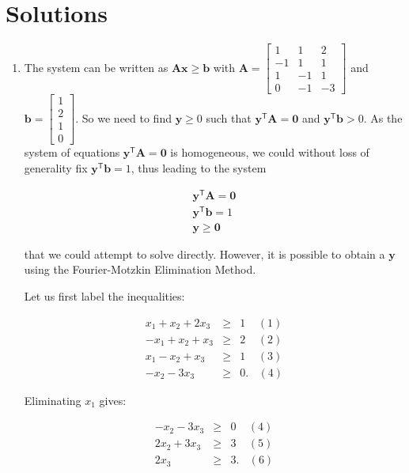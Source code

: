 \documentclass[]{book}
\providecommand{\tightlist}{%
  \setlength{\itemsep}{0pt}\setlength{\parskip}{0pt}}
\def\gt{>}
\newcommand{\mm}[1]{\mathbf{#1}}
\renewcommand{\vec}[1]{\mathbf{#1}}
\theoremstyle{definition}
\theoremstyle{definition}
\theoremstyle{remark}
\begin{document}
\section*{Solutions}\label{solutions-4}

\begin{enumerate}
\def\labelenumi{\arabic{enumi}.}
\tightlist
\item
  The system can be written as \(\mm{A}\vec{x} \geq \vec{b}\) with
  \(\mm{A} = \begin{bmatrix} 1 & 1 & 2 \\ -1 & 1 & 1 \\ 1 & -1 & 1 \\ 0 & -1 & -3 \end{bmatrix}\)
  and \(\vec{b} = \begin{bmatrix} 1 \\ 2 \\ 1 \\ 0\end{bmatrix}\). So we
  need to find \(\vec{y} \geq 0\) such that
  \(\vec{y}^\mathsf{T} \mm{A} = \vec{0}\) and
  \(\vec{y}^\mathsf{T} \vec{b} \gt 0\). As the system of equations
  \(\vec{y}^\mathsf{T} \mm{A} = \vec{0}\) is homogeneous, we could
  without loss of generality fix \(\vec{y}^\mathsf{T} \vec{b} = 1\),
  thus leading to the system

  \begin{eqnarray*}
  \vec{y}^\mathsf{T}\mm{A} = \vec{0} \\
  \vec{y}^\mathsf{T}\vec{b} = 1 \\
  \vec{y} \geq \vec{0}
  \end{eqnarray*}

  that we could attempt to solve directly. However, it is possible to
  obtain a \(\vec{y}\) using the Fourier-Motzkin Elimination Method.

  Let us first label the inequalities:

  \begin{eqnarray*}
  x_1 + x_2 + 2x_3& \geq & 1~~~~~(1) \\
  -x_1 + x_2 + x_3 & \geq & 2~~~~~(2) \\
  x_1-x_2 + x_3  & \geq & 1~~~~~(3) \\
  -x_2 - 3x_3 & \geq & 0.~~~~(4)
  \end{eqnarray*}

  Eliminating \(x_1\) gives:

  \begin{eqnarray*}
  -x_2 - 3x_3 & \geq & 0~~~~~(4) \\
  2x_2 + 3x_3& \geq & 3~~~~~(5) \\
  2x_3  & \geq & 3.~~~~(6) \\
  \end{eqnarray*}


\end{enumerate}
\end{document}
